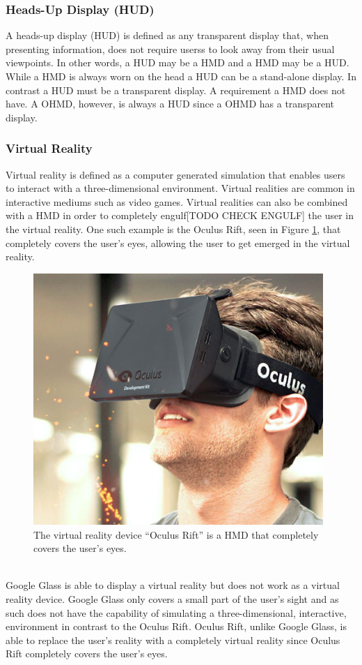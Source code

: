 \subsubsection{Heads-Up Display (HUD)}
\label{subsubsec:hud}
A heads-up display (HUD)\cite{hudWiki} is defined as any transparent display that, when presenting information, does not require userss to look away from their usual viewpoints. In other words, a HUD may be a HMD and a HMD may be a HUD. While a HMD is always worn on the head a HUD can be a stand-alone display. In contrast a HUD must be a transparent display. A requirement a HMD does not have. A OHMD, however, is always a HUD since a OHMD has a transparent display.

\subsubsection{Virtual Reality}
\label{subsubsec:vr}
Virtual reality\cite{virtualRealityDef} is defined as a computer generated simulation that enables users to interact with a three-dimensional environment. Virtual realities are common in interactive mediums such as video games. Virtual realities can also be combined with a HMD in order to completely engulf[TODO CHECK ENGULF] the user in the virtual reality. One such example is the Oculus Rift, seen in Figure \ref{OculusRift}, that completely covers the user's eyes, allowing the user to get emerged in the virtual reality.
\\
	\begin{figure}[ht!]
		\centering
		\includegraphics[width=110mm]{images/OculusRift}
		\caption{The virtual reality device ``Oculus Rift'' is a HMD that completely covers the user's eyes.\cite{ImagesOculusRift}}
		\label{OculusRift}
	\end{figure}
\\
Google Glass is able to display a virtual reality but does not work as a virtual reality device. Google Glass only covers a small part of the user's sight and as such does not have the capability of simulating a three-dimensional, interactive, environment in contrast to the Oculus Rift. Oculus Rift, unlike Google Glass, is able to replace the user's reality with a completely virtual reality since Oculus Rift completely covers the user's eyes.

